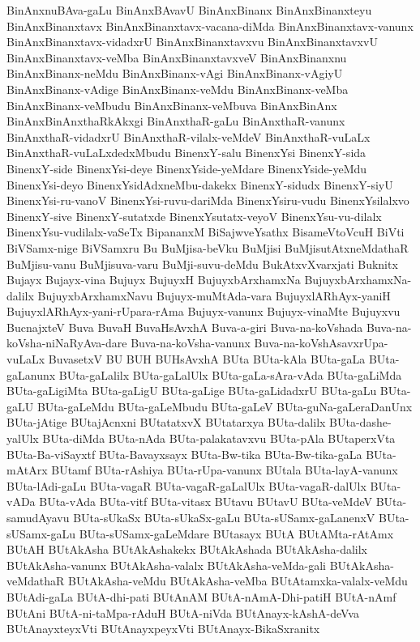 {BinAnxnuBAva-gaLu
BinAnxBAvavU
BinAnxBinanx
BinAnxBinanxteyu
BinAnxBinanxtavx
BinAnxBinanxtavx-vacana-diMda
BinAnxBinanxtavx-vanunx
BinAnxBinanxtavx-vidadxrU
BinAnxBinanxtavxvu
BinAnxBinanxtavxvU
BinAnxBinanxtavx-veMba
BinAnxBinanxtavxveV
BinAnxBinanxnu
BinAnxBinanx-neMdu
BinAnxBinanx-vAgi
BinAnxBinanx-vAgiyU
BinAnxBinanx-vAdige
BinAnxBinanx-veMdu
BinAnxBinanx-veMba
BinAnxBinanx-veMbudu
BinAnxBinanx-veMbuva
BinAnxBinAnx
BinAnxBinAnxthaRkAkxgi
BinAnxthaR-gaLu
BinAnxthaR-vanunx
BinAnxthaR-vidadxrU
BinAnxthaR-vilalx-veMdeV
BinAnxthaR-vuLaLx
BinAnxthaR-vuLaLxdedxMbudu
BinenxY-salu
BinenxYsi
BinenxY-sida
BinenxY-side
BinenxYsi-deye
BinenxYside-yeMdare
BinenxYside-yeMdu
BinenxYsi-deyo
BinenxYsidAdxneMbu-dakekx
BinenxY-sidudx
BinenxY-siyU
BinenxYsi-ru-vanoV
BinenxYsi-ruvu-dariMda
BinenxYsiru-vudu
BinenxYsilalxvo
BinenxY-sive
BinenxY-sutatxde
BinenxYsutatx-veyoV
BinenxYsu-vu-dilalx
BinenxYsu-vudilalx-vaSeTx
BipananxM
BiSajwveYsathx
BisameVtoVcuH
BiVti
BiVSamx-nige
BiVSamxru
Bu
BuMjisa-beVku
BuMjisi
BuMjisutAtxneMdathaR
BuMjisu-vanu
BuMjisuva-varu
BuMji-suvu-deMdu
BukAtxvXvarxjati
Buknitx
Bujayx
Bujayx-vina
Bujuyx
BujuyxH
BujuyxbArxhamxNa
BujuyxbArxhamxNa-dalilx
BujuyxbArxhamxNavu
Bujuyx-muMtAda-vara
BujuyxlARhAyx-yaniH
BujuyxlARhAyx-yani-rUpara-rAma
Bujuyx-vanunx
Bujuyx-vinaMte
Bujuyxvu
BucnajxteV
Buva
BuvaH
BuvaHsAvxhA
Buva-a-giri
Buva-na-koVshada
Buva-na-koVsha-niNaRyAva-dare
Buva-na-koVsha-vanunx
Buva-na-koVshAsavxrUpa-vuLaLx
BuvasetxV
BU
BUH
BUHsAvxhA
BUta
BUta-kAla
BUta-gaLa
BUta-gaLanunx
BUta-gaLalilx
BUta-gaLalUlx
BUta-gaLa-sAra-vAda
BUta-gaLiMda
BUta-gaLigiMta
BUta-gaLigU
BUta-gaLige
BUta-gaLidadxrU
BUta-gaLu
BUta-gaLU
BUta-gaLeMdu
BUta-gaLeMbudu
BUta-gaLeV
BUta-guNa-gaLeraDanUnx
BUta-jAtige
BUtajAcnxni
BUtatatxvX
BUtatarxya
BUta-dalilx
BUta-dashe-yalUlx
BUta-diMda
BUta-nAda
BUta-palakatavxvu
BUta-pAla
BUtaperxVta
BUta-Ba-viSayxtf
BUta-Bavayxsayx
BUta-Bw-tika
BUta-Bw-tika-gaLa
BUta-mAtArx
BUtamf
BUta-rAshiya
BUta-rUpa-vanunx
BUtala
BUta-layA-vanunx
BUta-lAdi-gaLu
BUta-vagaR
BUta-vagaR-gaLalUlx
BUta-vagaR-dalUlx
BUta-vADa
BUta-vAda
BUta-vitf
BUta-vitasx
BUtavu
BUtavU
BUta-veMdeV
BUta-samudAyavu
BUta-sUkaSx
BUta-sUkaSx-gaLu
BUta-sUSamx-gaLanenxV
BUta-sUSamx-gaLu
BUta-sUSamx-gaLeMdare
BUtasayx
BUtA
BUtAMta-rAtAmx
BUtAH
BUtAkAsha
BUtAkAshakekx
BUtAkAshada
BUtAkAsha-dalilx
BUtAkAsha-vanunx
BUtAkAsha-valalx
BUtAkAsha-veMda-gali
BUtAkAsha-veMdathaR
BUtAkAsha-veMdu
BUtAkAsha-veMba
BUtAtamxka-valalx-veMdu
BUtAdi-gaLa
BUtA-dhi-pati
BUtAnAM
BUtA-nAmA-Dhi-patiH
BUtA-nAmf
BUtAni
BUtA-ni-taMpa-rAduH
BUtA-niVda
BUtAnayx-kAshA-deVva
BUtAnayxteyxVti
BUtAnayxpeyxVti
BUtAnayx-BikaSxranitx
}
